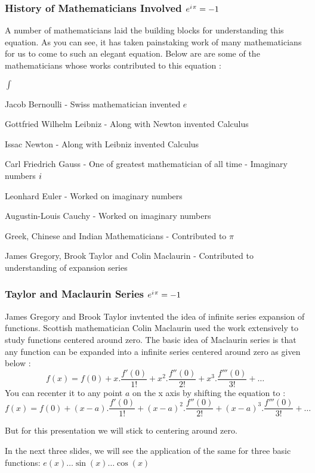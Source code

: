 \documentclass[10pt]{beamer}
\newcommand{\iu}{{i\mkern1mu}}
\begin{document}
\begin{frame}
	\frametitle{ History of Mathematicians Involved \hspace{25pt} \textcolor{pink}{\Huge\(e^{\iu \pi} = -1\)}}

	A number of mathematicians laid the building blocks for understanding this equation.  As you can see, it has taken painstaking work of many mathematicians for us to come to such an elegant equation. Below are are some of the mathematicians whose works contributed to this equation :
	\vspace{7pt}

	\begin{list}{$\int$}{}
		\item Jacob Bernoulli - Swiss mathematician invented $e$
		\item  Gottfried Wilhelm Leibniz  - Along with Newton invented Calculus
		\item Issac Newton - Along with Leibniz invented Calculus
		\item Carl Friedrich Gauss - One of  greatest mathematician of all time - Imaginary numbers $\iu$
		\item Leonhard Euler - Worked on imaginary numbers
		\item Augustin-Louis Cauchy - Worked on imaginary numbers
		\item Greek, Chinese and Indian Mathematicians - Contributed to $\pi$
		\item James Gregory, Brook Taylor and Colin Maclaurin - Contributed to understanding of expansion series
	\end{list}

\end{frame}

\begin{frame}
	\frametitle{Taylor and Maclaurin Series \hspace{25pt} \textcolor{pink}{\Huge\(e^{\iu \pi} = -1\)}}
	James Gregory and Brook Taylor invtented the idea of infinite series expansion of functions.  Scottish mathematician Colin Maclaurin used the work extensively to study functions centered around zero.  The basic idea of Maclaurin series is that any function can be expanded into a infinite series centered around zero as given below :
	\large $$f(x) = f(0)+x.\dfrac{f'(0)}{1!}+ x^2.\dfrac{f''(0)}{2!} +x^3.\dfrac{f'''(0)}{3!} + \dots$$
	You can recenter it to any point $a$ on the x axis by shifting the equation to  :
	\large $$f(x) = f(0)+(x-a).\dfrac{f'(0)}{1!}+ (x-a)^2.\dfrac{f''(0)}{2!} +(x-a)^3.\dfrac{f'''(0)}{3!} + \dots$$
	
	But for this presentation we will stick to centering around zero. 
	\vspace{10pt}

	In the next three slides, we will see the application of the same for three basic functions: $e(x) \dots \sin(x) \dots \cos(x)$
\end{frame}
\end{document}
